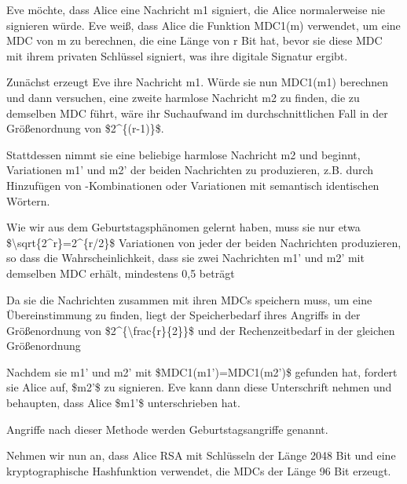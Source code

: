 \documentclass[a4paper]{article}
\begin{document}
\begin{multicols}{3}
\begin{itemize*}
            \begin{itemize*}
                  \item Eve möchte, dass Alice eine Nachricht m1 signiert, die Alice normalerweise nie signieren würde. Eve weiß, dass Alice die Funktion MDC1(m) verwendet, um eine MDC von m zu berechnen, die eine Länge von r Bit hat, bevor sie diese MDC mit ihrem privaten Schlüssel signiert, was ihre digitale Signatur ergibt.
                  \item Zunächst erzeugt Eve ihre Nachricht m1. Würde sie nun MDC1(m1) berechnen und dann versuchen, eine zweite harmlose Nachricht m2 zu finden, die zu demselben MDC führt, wäre ihr Suchaufwand im durchschnittlichen Fall in der Größenordnung von \$2\^{}\{(r-1)\}\$.
                  \item Stattdessen nimmt sie eine beliebige harmlose Nachricht m2 und beginnt, Variationen m1' und m2' der beiden Nachrichten zu produzieren, z.B. durch Hinzufügen von -Kombinationen oder Variationen mit semantisch identischen Wörtern.
            \end{itemize*}
            \item
            Wie wir aus dem Geburtstagsphänomen gelernt haben, muss sie nur etwa
            \$\textbackslash sqrt\{2\^{}r\}=2\^{}\{r/2\}\$ Variationen von jeder
            der beiden Nachrichten produzieren, so dass die Wahrscheinlichkeit,
            dass sie zwei Nachrichten m1' und m2' mit demselben MDC erhält,
            mindestens 0,5 beträgt
            \item
            Da sie die Nachrichten zusammen mit ihren MDCs speichern muss, um eine
            Übereinstimmung zu finden, liegt der Speicherbedarf ihres Angriffs in
            der Größenordnung von \$2\^{}\{\textbackslash frac\{r\}\{2\}\}\$ und
            der Rechenzeitbedarf in der gleichen Größenordnung
            \item
            Nachdem sie m1' und m2' mit \$MDC1(m1')=MDC1(m2')\$ gefunden hat,
            fordert sie Alice auf, \$m2'\$ zu signieren. Eve kann dann diese
            Unterschrift nehmen und behaupten, dass Alice \$m1'\$ unterschrieben
            hat.
            \item
            Angriffe nach dieser Methode werden Geburtstagsangriffe genannt.
            \item
            Nehmen wir nun an, dass Alice RSA mit Schlüsseln der Länge 2048 Bit
            und eine kryptographische Hashfunktion verwendet, die MDCs der Länge
            96 Bit erzeugt.


\end{itemize*}
\end{multicols}
\end{document}

